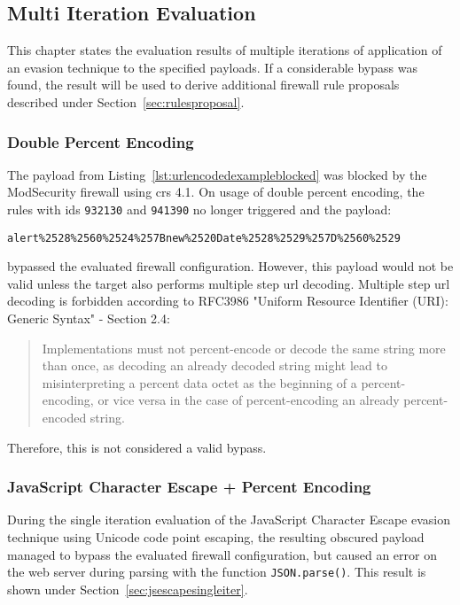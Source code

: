 \subsection{Multi Iteration Evaluation}
\label{sec:multiiteration}
This chapter states the evaluation results of multiple iterations of application of an evasion technique to the specified payloads. If a considerable bypass was found, the result will be used to derive additional firewall rule proposals described under Section~\ref{sec:rulesproposal}.

\subsubsection{Double Percent Encoding}
\label{sec:doublepercenc}
The payload from Listing~\ref{lst:urlencodedexampleblocked} was blocked by the ModSecurity firewall using \acrshort{crs} 4.1.
On usage of double percent encoding, the rules with ids \verb|932130| and \verb|941390| no longer triggered and the payload:

\begin{lstlisting}[style=basicStyle]
alert%2528%2560%2524%257Bnew%2520Date%2528%2529%257D%2560%2529
\end{lstlisting}

bypassed the evaluated firewall configuration.
However, this payload would not be valid unless the target also performs multiple step url decoding. Multiple step url decoding is forbidden according to RFC3986 "Uniform Resource Identifier (URI): Generic Syntax" - Section 2.4:
\begin{quote}
	Implementations must not
	percent-encode or decode the same string more than once, as decoding
	an already decoded string might lead to misinterpreting a percent
	data octet as the beginning of a percent-encoding, or vice versa in
	the case of percent-encoding an already percent-encoded string. \cite{rfc3986/sec2.4}
\end{quote}

Therefore, this is not considered a valid bypass.


\subsubsection{JavaScript Character Escape + Percent Encoding}
\label{sec:jsencpercenc}
During the single iteration evaluation of the JavaScript Character Escape evasion technique using Unicode code point escaping, the resulting obscured payload managed to bypass the evaluated firewall configuration, but caused an error on the web server during parsing with the function \verb|JSON.parse()|. This result is shown under Section~\ref{sec:jsescapesingleiter}.

